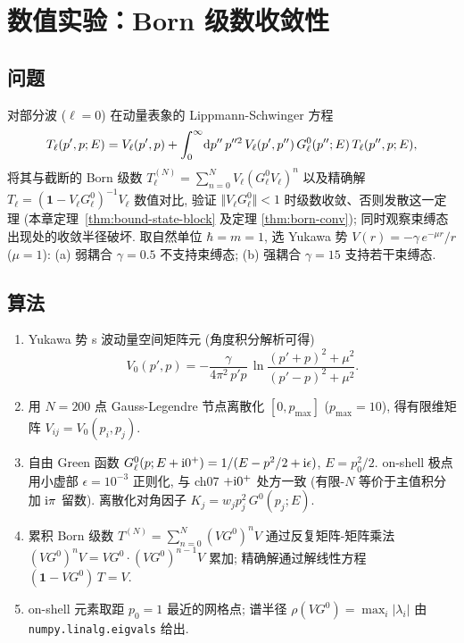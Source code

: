 \section{数值实验：Born 级数收敛性}\label{sec:numexp-ch08}

\subsection*{问题}
对部分波 ($\ell=0$) 在动量表象的 Lippmann-Schwinger 方程
\begin{equation}
T_{\ell}(p',p;E)=V_{\ell}(p',p)+\int_{0}^{\infty}\!\mathrm{d} p''\,p''^{2}\,
V_{\ell}(p',p'')\,G^{0}_{\ell}(p'';E)\,T_{\ell}(p'',p;E),
\label{eq:numexp-ch08-LS}
\end{equation}
将其与截断的 Born 级数
\(T^{(N)}_{\ell}=\sum_{n=0}^{N}V_{\ell}(G^{0}_{\ell}V_{\ell})^{n}\) 以及精确解
\(T_{\ell}=(\mathbf{1}-V_{\ell}G^{0}_{\ell})^{-1}V_{\ell}\) 数值对比, 验证
\(\Vert V_{\ell}G^{0}_{\ell}\Vert<1\) 时级数收敛、否则发散这一定理 (本章定理~\ref{thm:bound-state-block} 及定理
\ref{thm:born-conv}); 同时观察束缚态出现处的收敛半径破坏.
取自然单位 $\hbar=m=1$, 选 Yukawa 势
$V(r)=-\gamma\,e^{-\mu r}/r$ ($\mu=1$): (a) 弱耦合 $\gamma=0.5$ 不支持束缚态;
(b) 强耦合 $\gamma=15$ 支持若干束缚态.

\subsection*{算法}
\begin{enumerate}
\item Yukawa 势 s 波动量空间矩阵元 (角度积分解析可得)
\begin{equation}
V_{0}(p',p)=-\frac{\gamma}{4\pi^{2}\,p'p}\,
\ln\frac{(p'+p)^{2}+\mu^{2}}{(p'-p)^{2}+\mu^{2}}.
\end{equation}
\item 用 $N=200$ 点 Gauss-Legendre 节点离散化 $[0,p_{\max}]$ ($p_{\max}=10$),
得有限维矩阵 $V_{ij}=V_{0}(p_{i},p_{j})$.
\item 自由 Green 函数 $G^{0}_{\ell}(p;E+\mathrm{i} 0^{+})=1/(E-p^{2}/2+\mathrm{i}\epsilon)$,
$E=p_{0}^{2}/2$. on-shell 极点用小虚部 $\epsilon=10^{-3}$ 正则化, 与 ch07
$+\mathrm{i} 0^{+}$ 处方一致 (有限-$N$ 等价于主值积分加 $\mathrm{i}\pi$ 留数).
离散化对角因子 $K_{j}=w_{j}p_{j}^{2}\,G^{0}(p_{j};E)$.
\item 累积 Born 级数 $T^{(N)}=\sum_{n=0}^{N}(VG^{0})^{n}V$ 通过反复矩阵-矩阵乘法
$(VG^{0})^{n}V=VG^{0}\cdot(VG^{0})^{n-1}V$ 累加; 精确解通过解线性方程
$(\mathbf{1}-VG^{0})\,T=V$.
\item on-shell 元素取距 $p_{0}=1$ 最近的网格点; 谱半径
$\rho(VG^{0})=\max_{i}|\lambda_{i}|$ 由 \texttt{numpy.linalg.eigvals} 给出.
\end{enumerate}

